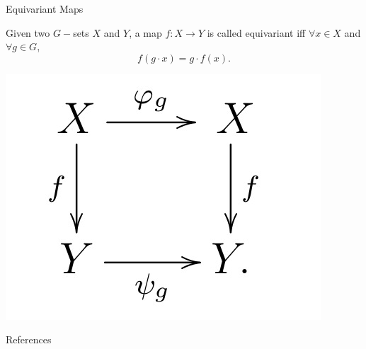 \documentclass{beamer}
\begin{document}
\begin{frame}{Equivariant Maps}
  \begin{definition}
    Given two $G-$sets $X$ and $Y$, a map $f: X \to Y$ is called equivariant iff $\forall x \in X$ and $\forall g \in G$, 
    \[ 
    f(g \cdot x) = g \cdot f(x)
    .\]
  \end{definition}
  \centering \includegraphics[width=.5\linewidth]{equivariant_map.jpeg}
\end{frame}
\begin{frame}{References}
  
  

  
\end{frame}
\end{document}
